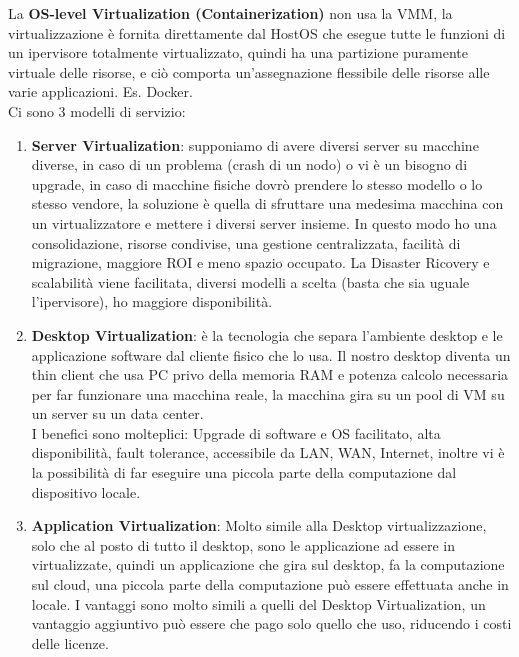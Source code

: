\documentclass[11pt, twocolumn]{article}
\newenvironment{myenumerate}
{ \begin{enumerate}
		\setlength{\itemsep}{0pt}
		\setlength{\parskip}{0pt}
		\setlength{\parsep}{0pt}     }
	{ \end{enumerate}                  }
\begin{document}
La \textbf{OS-level Virtualization (Containerization)} non usa la VMM, la virtualizzazione è fornita direttamente dal HostOS che esegue tutte le funzioni di un ipervisore totalmente virtualizzato, quindi ha una partizione puramente virtuale delle risorse, e ciò comporta un'assegnazione flessibile delle risorse alle varie applicazioni. Es. Docker.\\
Ci sono 3 modelli di servizio:
\begin{myenumerate}
	\item \textbf{Server Virtualization}: supponiamo di avere diversi server su macchine diverse, in caso di un problema (crash di un nodo) o vi è un bisogno di upgrade, in caso di macchine fisiche dovrò prendere lo stesso modello o lo stesso vendore, la soluzione è quella di sfruttare una medesima macchina con un virtualizzatore e mettere i diversi server insieme.
	In questo modo ho una consolidazione, risorse condivise, una gestione centralizzata, facilità di migrazione, maggiore ROI e meno spazio occupato.
	La Disaster Ricovery e scalabilità viene facilitata, diversi modelli a scelta (basta che sia uguale l'ipervisore), ho maggiore disponibilità.
	\item \textbf{Desktop Virtualization}: è la tecnologia che separa l'ambiente desktop e le applicazione software dal cliente fisico che lo usa. 
	Il nostro desktop diventa un thin client che usa PC privo della memoria RAM e potenza calcolo necessaria per far funzionare una macchina reale, la macchina gira su un pool di VM su un server su un data center.\\
	I benefici sono molteplici: Upgrade di software e OS facilitato, alta disponibilità, fault tolerance, accessibile da LAN, WAN, Internet, inoltre vi è la possibilità di far eseguire una piccola parte della computazione dal dispositivo locale.
	\item \textbf{Application Virtualization}: Molto simile alla Desktop virtualizzazione, solo che al posto di tutto il desktop, sono le applicazione ad essere in virtualizzate, quindi un applicazione che gira sul desktop, fa la computazione sul cloud, una piccola parte della computazione può essere effettuata anche in locale.
	I vantaggi sono molto simili a quelli del Desktop Virtualization, un vantaggio aggiuntivo può essere che pago solo quello che uso, riducendo i costi delle licenze.
\end{myenumerate}
\end{document}
